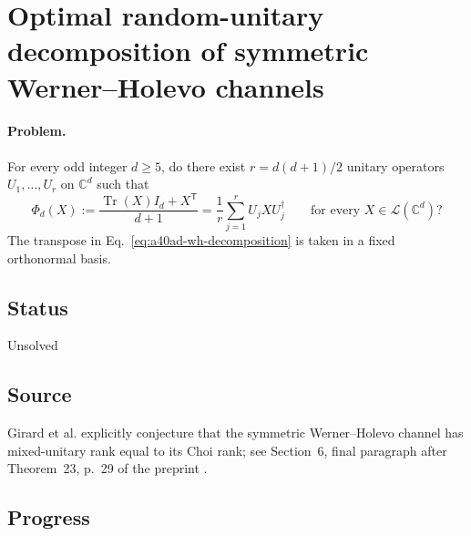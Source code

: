 \section{Optimal random-unitary decomposition of symmetric Werner--Holevo channels}
\label{sec:op_a40ad449c54093d7}

\paragraph{Problem.}
For every odd integer $d\geq5$, do there exist $r=d(d+1)/2$ unitary
operators $U_1,\ldots,U_r$ on $\mathbb C^d$ such that
\begin{equation}
  \Phi_d(X):=\frac{\operatorname{Tr}(X)I_d+X^{\mathsf T}}{d+1}
  =\frac1r\sum_{j=1}^{r}U_j XU_j^\dagger
  \qquad\text{for every }X\in\mathcal L(\mathbb C^d)?
  \label{eq:a40ad-wh-decomposition}
\end{equation}
The transpose in Eq.~\eqref{eq:a40ad-wh-decomposition} is taken in a fixed
orthonormal basis.

\subsection*{Status}

Unsolved

\subsection*{Source}

Girard et al. explicitly conjecture that the symmetric Werner--Holevo
channel has mixed-unitary rank equal to its Choi rank; see Section~6,
final paragraph after Theorem~23, p.~29 of the preprint
.

\subsection*{Progress}

